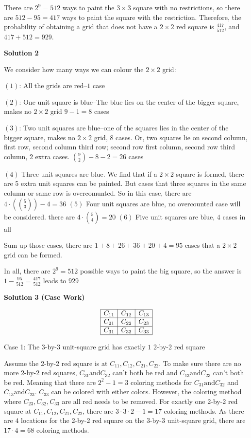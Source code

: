 \begin{enumerate}
 There are $2^9=512$ ways to paint the $3 \times 3$ square with no restrictions, so there are $512-95=417$ ways to paint the square with the restriction. Therefore, the probability of obtaining a grid that does not have a $2 \times 2$ red square is $\frac{417}{512}$, and $417+512=\boxed{929}$.

 



\textbf{Solution 2}

We consider how many ways we can colour the $2 \times 2$ grid:

 $(1)$: All the grids are red--$1$ case

 $(2)$: One unit square is blue--The blue lies on the center of the bigger square, makes no $2 \times 2$ grid $9-1=8$ cases

 $(3)$: Two unit squares are blue--one of the squares lies in the center of the bigger square, makes no $2 \times 2$ grid, $8$ cases. Or, two squares lie on second column, first row, second column third row; second row first column, second row third column, 2 extra cases. $\binom 9 2-8-2=26$ cases

 $(4)$ Three unit squares are blue. We find that if a $2 \times 2$ square is formed, there are 5 extra unit squares can be painted. But cases that three squares in the same column or same row is overcomunted. So in this case, there are $4\cdot (\binom 5 3)-4=36$
$(5)$ Four unit squares are blue, no overcounted case will be considered. there are $4\cdot \binom 5 4=20$
$(6)$ Five unit squares are blue, $4$ cases in all

 Sum up those cases, there are $1+8+26+36+20+4=95$ cases that a $2 \times 2$ grid can be formed.

 In all, there are $2^9=512$ possible ways to paint the big square, so the answer is $1-\frac{95}{512}=\frac{417}{512}$ leads to $\boxed{929}$




\textbf{Solution 3 (Case Work)}


 \[\begin{array}{|c|c|c|} \hline C_{11} & C_{12} & C_{13}\\ \hline C_{21} & C_{22} & C_{23}\\ \hline C_{31} & C_{32} & C_{33}\\ \hline \end{array}\]

 Case 1: The 3-by-3 unit-square grid has exactly $1$ 2-by-2 red square

 Assume the 2-by-2 red square is at $C_{11}, C_{12}, C_{21}, C_{22}$. To make sure there are no more 2-by-2 red squares, $C_{31} \text{and} C_{32}$ can't both be red and $C_{13} \text{and} C_{23}$ can't both be red. Meaning that there are $2^2-1=3$ coloring methods for $C_{31} \text{and} C_{32}$ and $C_{13} \text{and} C_{23}$. $C_{33}$ can be colored with either colors. However, the coloring method where $C_{23}, C_{32}, C_{33}$ are all red needs to be removed. For exactly one 2-by-2 red square at $C_{11}, C_{12}, C_{21}, C_{22}$, there are $3 \cdot 3 \cdot 2 -1=17$ coloring methods. As there are $4$ locations for the 2-by-2 red square on the 3-by-3 unit-square grid, there are $17 \cdot 4 = 68$ coloring methods.


\end{enumerate}
